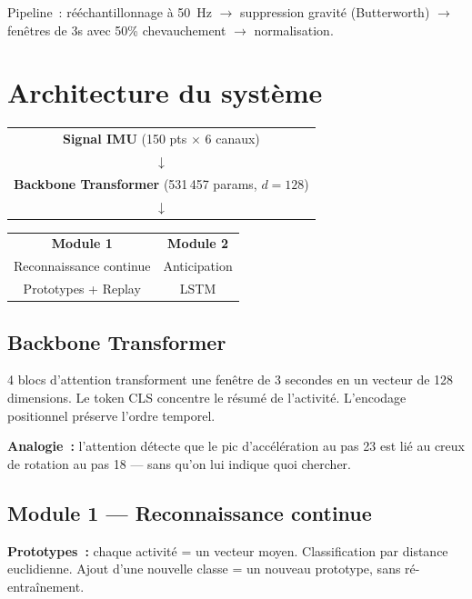 \documentclass[12pt, a4paper]{article}
\begin{document}
Pipeline~: rééchantillonnage à 50~Hz $\to$ suppression gravité (Butterworth) $\to$
fenêtres de 3s avec 50\% chevauchement $\to$ normalisation.

\section{Architecture du système}

\begin{center}
\begin{tabular}{|c|}
\hline
\textbf{Signal IMU} (150 pts $\times$ 6 canaux) \\
$\downarrow$ \\
\textbf{Backbone Transformer} (531\,457 params, $d=128$) \\
$\downarrow$ \\
\hline
\end{tabular}
\quad
\begin{tabular}{|c|c|}
\hline
\textbf{Module 1} & \textbf{Module 2} \\
Reconnaissance continue & Anticipation \\
Prototypes + Replay & LSTM \\
\hline
\end{tabular}
\end{center}

\subsection{Backbone Transformer}

4 blocs d'attention transforment une fenêtre de 3 secondes en un
vecteur de 128 dimensions. Le token CLS concentre le résumé de
l'activité. L'encodage positionnel préserve l'ordre temporel.

\begin{boitegrise}
\textbf{Analogie~:} l'attention détecte que le pic d'accélération au pas 23
est lié au creux de rotation au pas 18 --- sans qu'on lui indique quoi chercher.
\end{boitegrise}

\subsection{Module 1 --- Reconnaissance continue}

\textbf{Prototypes~:} chaque activité = un vecteur moyen. Classification par
distance euclidienne. Ajout d'une nouvelle classe = un nouveau prototype,
sans ré-entraînement.
\end{document}
